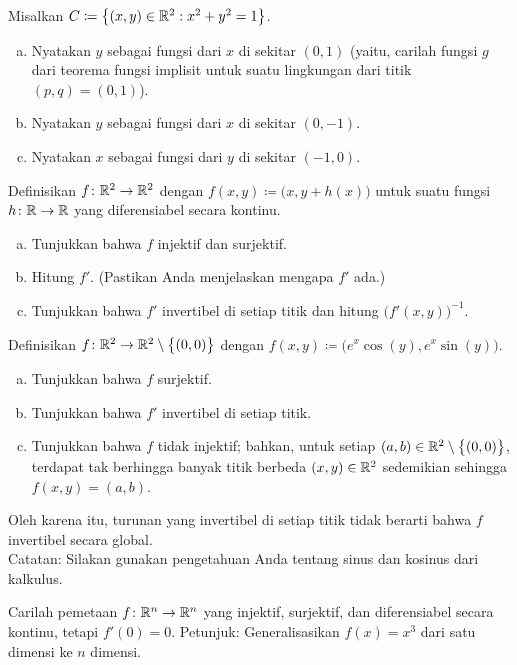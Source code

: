 \begin{exercise}
Misalkan $C \coloneqq \bigl\{ (x,y) \in {\mathbb{R}}^2 : x^2+y^2 = 1 \bigr\}$.
\begin{enumerate}[a)]
\item
Nyatakan $y$ sebagai fungsi dari $x$ di sekitar $(0,1)$ (yaitu, carilah fungsi $g$
dari teorema fungsi implisit untuk suatu lingkungan dari titik $(p,q) = (0,1)$).
\item
Nyatakan $y$ sebagai fungsi dari $x$ di sekitar $(0,-1)$.
\item
Nyatakan $x$ sebagai fungsi dari $y$ di sekitar $(-1,0)$.
\end{enumerate}
\end{exercise}

\begin{exercise}
Definisikan $f \colon {\mathbb{R}}^2 \to {\mathbb{R}}^2$ dengan $f(x,y) \coloneqq
\bigl(x,y+h(x)\bigr)$ untuk suatu fungsi $h \colon {\mathbb{R}} \to {\mathbb{R}}$ yang diferensiabel
secara kontinu.
\begin{enumerate}[a)]
\item
Tunjukkan bahwa $f$ injektif dan surjektif.
\item
Hitung $f'$.  (Pastikan Anda menjelaskan mengapa $f'$ ada.)
\item
Tunjukkan bahwa $f'$ invertibel di setiap titik dan hitung
${\bigl(f'(x,y)\bigr)}^{-1}$.
\end{enumerate}
\end{exercise}

\begin{exercise}
Definisikan $f \colon {\mathbb{R}}^2 \to {\mathbb{R}}^2 \setminus \bigl\{ (0,0) \bigr\}$ dengan
$f(x,y) \coloneqq \bigl(e^x\cos(y),e^x\sin(y)\bigr)$.
\begin{enumerate}[a)]
\item
Tunjukkan bahwa $f$ surjektif.
\item
Tunjukkan bahwa $f'$ invertibel di setiap titik.
\item
Tunjukkan bahwa $f$ tidak injektif; bahkan, untuk setiap $(a,b) \in {\mathbb{R}}^2
\setminus \bigl\{ (0,0) \bigr\}$,
terdapat tak berhingga banyak titik berbeda $(x,y) \in {\mathbb{R}}^2$ sedemikian sehingga 
$f(x,y) = (a,b)$.
\end{enumerate}
Oleh karena itu, turunan yang invertibel di setiap titik tidak berarti bahwa
$f$ invertibel secara global.\\
Catatan: Silakan gunakan pengetahuan Anda tentang sinus dan kosinus dari kalkulus.
\end{exercise}

\begin{exercise}
Carilah pemetaan $f \colon {\mathbb{R}}^n \to {\mathbb{R}}^n$ yang injektif, surjektif,
dan diferensiabel secara kontinu, tetapi $f'(0) = 0$.  Petunjuk: Generalisasikan $f(x) = x^3$ dari satu
dimensi ke $n$ dimensi.
\end{exercise}

